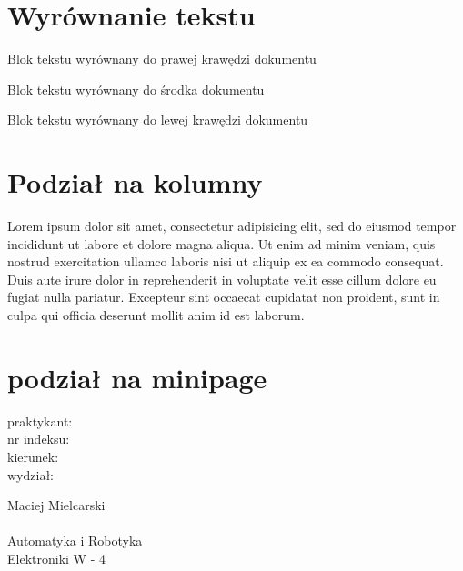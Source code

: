 \documentclass{article}
\begin{document}
\section{Wyrównanie tekstu}

\begin{flushright}
Blok tekstu wyrównany do prawej krawędzi dokumentu
\end{flushright}

\begin{center}
Blok tekstu wyrównany do środka dokumentu
\end{center}

\begin{flushleft}
Blok tekstu wyrównany do lewej krawędzi dokumentu
\end{flushleft}

\section{Podział na kolumny}

\begin{multicols}{2}	%
\lstset{tabsize=1}		%

Lorem ipsum dolor sit amet, consectetur adipisicing elit, sed do eiusmod tempor incididunt ut labore et dolore magna aliqua. Ut enim ad minim veniam, quis nostrud exercitation ullamco laboris nisi ut aliquip ex ea commodo consequat. Duis aute irure dolor in reprehenderit in voluptate velit esse cillum dolore eu fugiat nulla pariatur. Excepteur sint occaecat cupidatat non proident, sunt in culpa qui officia deserunt mollit anim id est laborum.

\end{multicols}

\section{podział na minipage}

\begin{center}
\begin{minipage}[t]{0.47\textwidth}
	\begin{minipage}[t]{0.3\textwidth}
		\begin{flushright}
			\large{praktykant:\\nr indeksu:\\kierunek:\\wydział:}
		\end{flushright}
	\end{minipage} 
	\begin{minipage}[t]{0.7\textwidth}
		\begin{flushleft}
			\large{\quad Maciej Mielcarski\\
			\\
			\quad Automatyka i Robotyka\\
			\quad Elektroniki W - 4}
		\end{flushleft}
	\end{minipage} 
\end{minipage} 
\end{center}
\end{document}
